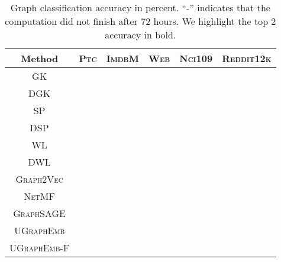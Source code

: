 \documentclass{article}
\newcommand{\model}{\textsc{UGraphEmb}\xspace}
\newcommand{\netmf}{\textsc{NetMF}\xspace}
\newcommand{\graphsage}{\textsc{GraphSAGE}\xspace}
\newcommand{\gv}{\textsc{Graph2Vec}\xspace}
\newcommand{\ptc}{\textsc{Ptc}\xspace}
\newcommand{\imdb}{\textsc{ImdbM}\xspace}
\newcommand{\web}{\textsc{Web}\xspace}
\newcommand{\nci}{\textsc{Nci109}\xspace}
\newcommand{\reddit}{\textsc{Reddit12k}\xspace}
\begin{document}
\begin{table}
\scriptsize
\centering
\begin{tabular}{cccccc}
    \toprule
    \textbf{Method} & \textbf{\ptc} & \textbf{\imdb} & \textbf{\web} & \textbf{\nci} & \textbf{\reddit} \\
      \midrule
      


    \textsc{GK} &  &  &  &  &  \\
    \textsc{DGK} &  &  &  &  &  \\ 
    \textsc{SP} &  &  &  &  &  \\
    \textsc{DSP} &  &  &  &  &  \\
    \textsc{WL} &  &  &  &  &  \\ 
    \textsc{DWL} &  &  &  &  &  \\ \hline
    \gv &  &  &  &  &  \\
    \netmf &  &  &  &  &  \\
    \graphsage &  &  &  &  &  \\
\hline
\textsc{\model} &  &  &  &  &  \\
    \textsc{\model-F} &  &  &  &  &  \\ \hline
\end{tabular}
\centering
\caption{Graph classification accuracy in percent. ``-'' indicates that the computation did not finish after 72 hours. We highlight the top 2 accuracy in bold.}
\label{table:classif_results}
\end{table}
\end{document}

